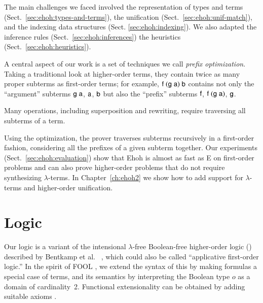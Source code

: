 The main challenges we faced involved the
representation of types and terms
(Sect.~\ref{sec:ehoh:types-and-terms}), the unification
(Sect.~\ref{sec:ehoh:unif-match}), and the indexing data structures
(Sect. \ref{sec:ehoh:indexing}). We also adapted the
inference rules (Sect.~\ref{sec:ehoh:inferences}) the
heuristics (Sect.~\ref{sec:ehoh:heuristics}).

A central aspect of our work is a set of techniques we call
\emph{prefix optimization}. Taking a traditional look at higher-order terms, they contain twice as many proper
subterms as first-order terms; for example,
$\mathsf{f}\;(\mathsf{g}\;\mathsf{a})\;\mathsf{b}$ contains not only the ``argument'' subterms
$\mathsf{g}\;\mathsf{a}$, $\mathsf{a}$, $\mathsf{b}$ but also the ``prefix'' subterms
$\mathsf{f}$, $\mathsf{f}\;(\mathsf{g}\;\mathsf{a})$, $\mathsf{g}$.
\begin{rep}Many operations, including superposition and rewriting, require
traversing all subterms of a term.\end{rep}
Using the optimization, the prover traverses subterms recursively in a
first-order fashion, considering all the prefixes of a given subterm
together. %
%
Our experiments (Sect.~\ref{sec:ehoh:evaluation}) show that Ehoh is
almost as fast as E on first-order problems and can also prove
higher-order problems that do not require synthesizing
$\lambda$-terms. In Chapter~\ref{ch:ehoh2} we show how to add support for
$\lambda$-terms and higher-order unification.

\section{Logic}
\label{sec:ehoh:logic}

Our logic is a variant of the intensional $\lambda$-free Boolean-free
higher-order logic (\lfhol{}) described by Bentkamp et al.\
\cite[Sect.~2]{bbcw-21-lfho}, which could also be called ``applicative
first-order logic.'' In the spirit of FOOL \cite{kotelnikov-16-fool}, we
extend the syntax of this by making formulas a special case of terms,
and its semantics by interpreting the Boolean type $o$ as a domain of
cardinality~2. Functional extensionality can be obtained by adding suitable
axioms \cite[Sect.~3.1]{bbcw-21-lfho}.



